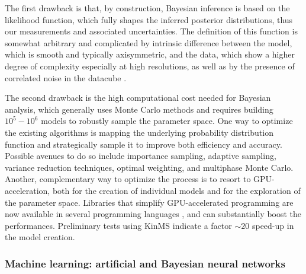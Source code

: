 \documentclass[a4paper,11pt]{article}
\begin{document}
The first drawback is that, by construction, Bayesian inference is based on the likelihood function, which fully shapes the inferred posterior distributions, thus our measurements and associated uncertainties. The definition of this function is somewhat arbitrary and complicated by intrinsic difference between the model, which is smooth and typically axisymmetric, and the data, which show a higher degree of complexity especially at high resolutions, as well as by the presence of correlated noise in the datacube \citep[e.g.,][]{Davis+17}. 

The second drawback is the high computational cost needed for Bayesian analysis, which generally uses Monte Carlo methods and requires building $10^5-10^6$ models to robustly sample the parameter space. One way to optimize the existing algorithms is mapping the underlying probability distribution function and strategically sample it to improve both efficiency and accuracy. Possible avenues to do so include importance sampling, adaptive sampling, variance reduction techniques, optimal weighting, and multiphase Monte Carlo. Another, complementary way to optimize the process is to resort to GPU-acceleration, both for the creation of individual models and for the exploration of the parameter space. Libraries that simplify GPU-accelerated programming are now available in several programming languages \citep[e.g., the JAX library in python,][]{jax2018github}, and can substantially boost the performances. Preliminary tests using KinMS \citep{Davis13,Davis20} indicate a factor $\sim20$ speed-up in the model creation.

\subsubsection{Machine learning: artificial and Bayesian neural networks}\label{sss:neuralnetworks}
\end{document}
